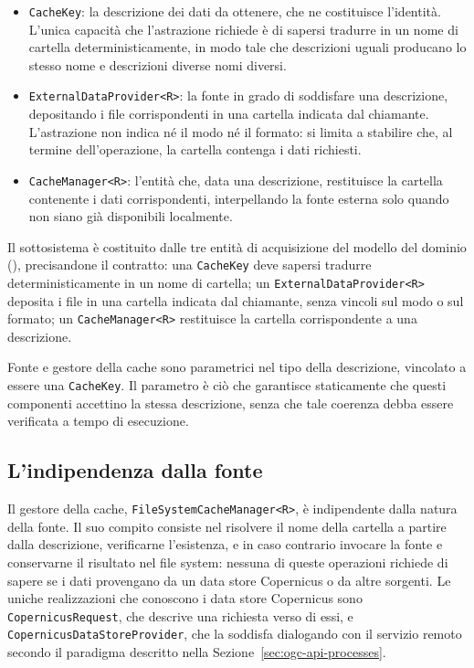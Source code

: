 \begin{itemize}
    \item \texttt{CacheKey}: la descrizione dei dati da ottenere, che ne costituisce
    l'identità. L'unica capacità che l'astrazione richiede è di sapersi tradurre in un nome
    di cartella deterministicamente, in modo tale che descrizioni uguali producano lo stesso nome e
    descrizioni diverse nomi diversi.
    \item \texttt{ExternalDataProvider<R>}: la fonte in grado di soddisfare una
    descrizione, depositando i file corrispondenti in una cartella indicata dal chiamante.
    L'astrazione non indica né il modo né il formato: si limita a stabilire che,
    al termine dell'operazione, la cartella contenga i dati richiesti.
    \item \texttt{CacheManager<R>}: l'entità che, data una descrizione, restituisce la
    cartella contenente i dati corrispondenti, interpellando la fonte esterna solo quando
    non siano già disponibili localmente.
\end{itemize}
\fi
Il sottosistema è costituito dalle tre entità di acquisizione del modello del
dominio (), precisandone il contratto: una \texttt{CacheKey}
deve sapersi tradurre deterministicamente in un nome di cartella; un
\texttt{ExternalDataProvider<R>} deposita i file in una cartella indicata dal chiamante,
senza vincoli sul modo o sul formato; un \texttt{CacheManager<R>} restituisce la cartella
corrispondente a una descrizione.

Fonte e gestore della cache sono parametrici nel tipo della descrizione, vincolato a essere una
\texttt{CacheKey}. Il parametro è ciò che garantisce staticamente che
questi componenti accettino la stessa descrizione, senza
che tale coerenza debba essere verificata a tempo di esecuzione.

\subsection{L'indipendenza dalla fonte}
\label{subsec:acquisizione-indipendenza}

Il gestore della cache, \texttt{FileSystemCacheManager<R>}, è indipendente dalla natura della
fonte. Il suo compito consiste nel risolvere il nome della cartella a partire dalla
descrizione, verificarne l'esistenza, e in caso contrario invocare la fonte e conservarne
il risultato nel file system: nessuna di queste operazioni richiede di sapere se i dati
provengano da un data store Copernicus o da altre sorgenti.
Le uniche realizzazioni che conoscono i data store Copernicus
sono \texttt{CopernicusRequest}, che descrive una richiesta verso di essi, e
\texttt{CopernicusDataStoreProvider}, che la soddisfa dialogando con il servizio remoto
secondo il paradigma descritto nella Sezione~\ref{sec:ogc-api-processes}.

